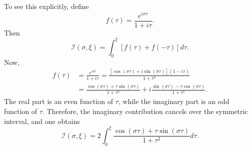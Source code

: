 \begin{resolucao}[Solution]
        To see this explicitly, define
        \begin{equation}
            f(\tau)
            =
            \frac{
            e^{i\sigma\tau}
            }{
            1+i\tau
            }.
        \end{equation}
        Then
        \begin{equation}
            \mathcal I(\sigma,\xi)
            =
            \int_0^\xi
            \left[
            f(\tau)+f(-\tau)
            \right]d\tau.
        \end{equation}
        Now,
        \begin{align}
            f(\tau)
            &=
            \frac{e^{i\sigma\tau}}{1+i\tau}
            =
            \frac{
            \left[\cos(\sigma\tau)+i\sin(\sigma\tau)\right](1-i\tau)
            }{
            1+\tau^2
            }
            \nonumber\\
            &=
            \frac{
            \cos(\sigma\tau)+\tau\sin(\sigma\tau)
            }{
            1+\tau^2
            }
            +
            i
            \frac{
            \sin(\sigma\tau)-\tau\cos(\sigma\tau)
            }{
            1+\tau^2
            }.
        \end{align}
        The real part is an even function of $\tau$, while the imaginary part is an odd function of $\tau$. Therefore, the imaginary contribution cancels over the symmetric interval, and one obtains
        \begin{equation}
            \mathcal I(\sigma,\xi)
            =
            2
            \int_0^\xi
            \frac{
            \cos(\sigma\tau)+\tau\sin(\sigma\tau)
            }{
            1+\tau^2
            }
            d\tau.
            \label{eq:symmetric_amplitude_integral}
        \end{equation}


\end{resolucao}
